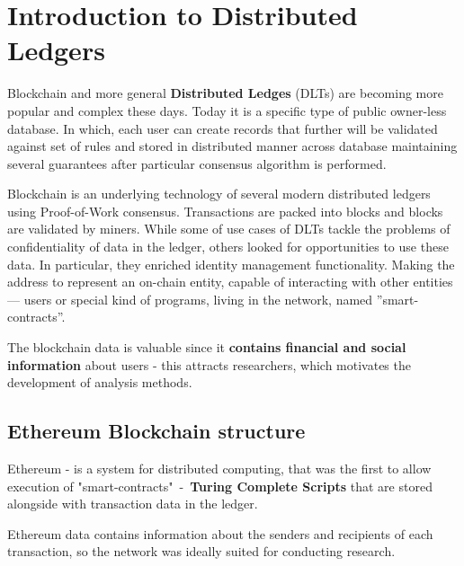 \Introduction

\section{Introduction to Distributed Ledgers}
Blockchain and more general \textbf{Distributed Ledges} (DLTs) are becoming more popular and complex these days. Today it is a specific type of public owner-less database. In which, each user can create records that further will be validated against set of rules and stored in distributed manner across database maintaining several guarantees after particular consensus algorithm is performed.

Blockchain is an underlying technology of several modern distributed ledgers using Proof-of-Work consensus. Transactions are packed into blocks and blocks are validated by miners. While some of use cases of DLTs tackle the problems of confidentiality of data in the ledger, others looked for opportunities to use these data. In particular, they enriched identity management functionality. Making the address to represent an on-chain entity, capable of interacting with other entities — users or special kind of programs, living in the network, named ”smart-contracts”.

The blockchain data is valuable since it \textbf{contains financial and social information} about users - this attracts researchers, which motivates the development of analysis methods.

\subsection{Ethereum Blockchain structure}
Ethereum - is a system for distributed computing, that was the first to allow execution of "smart-contracts"\ -\ \textbf{Turing Complete Scripts} that are stored alongside with transaction data in the ledger. 

Ethereum data\cite{will_price_2019} contains information about the senders and recipients of each transaction, so the network was ideally suited for conducting research. %
\\

